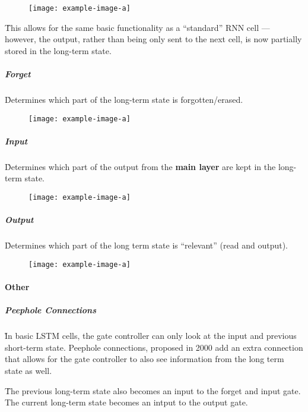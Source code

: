 \begin{figure}
	\centering
	\texttt{[image: example-image-a]}\hfil
	\caption{}
\end{figure}

\r{This allows for the same basic functionality as a ``standard'' RNN cell --- however, the output, rather than being only sent to the next cell, is now partially stored in the long-term state.}


\subparagraph{Forget}

\r{Determines which part of the long-term state is forgotten/erased.}

\begin{figure}
	\centering
	\texttt{[image: example-image-a]}\hfil
	\caption{}
\end{figure}



\subparagraph{Input}

\r{Determines which part of the output from the \textbf{main layer} are kept in the long-term state.}

\begin{figure}
	\centering
	\texttt{[image: example-image-a]}\hfil
	\caption{}
\end{figure}

\subparagraph{Output}

\r{Determines which part of the long term state is ``relevant'' (read and output).}

\begin{figure}
	\centering
	\texttt{[image: example-image-a]}\hfil
	\caption{}
\end{figure}


\paragraph{Other}

\subparagraph{Peephole Connections}

\r{In basic LSTM cells, the gate controller can only look at the input and previous short-term state. Peephole connections, proposed in 2000  add an extra connection that allows for the gate controller to also see information from the long term state as well. }

\r{The previous long-term state also becomes an input to the forget and input gate. The current long-term state becomes an intput to the output gate.}




